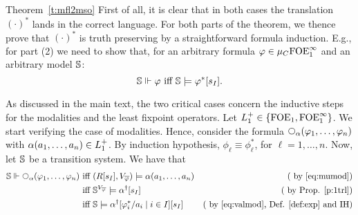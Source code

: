 \begin{proofof}{Theorem~\ref{t:mfl2mso}}
First of all, it is clear that in both cases the translation $(\cdot)^{*}$ lands 
in the correct language.
For both parts of the theorem, we thence prove that $(\cdot)^{*}$ is truth
preserving by a straightforward formula induction.
E.g., for part (2) we need to show that, for an arbitrary formula $\varphi\in
\mu_{C}\mathrm{FOE}^{\infty}_1$ and an arbitrary model $\mathbb{S}$:
\begin{equation}
\label{eq:xxxx1}
\bbS \mmodels \phi \text{ iff } \bbS \models \phi^{*}[s_{I}].
\end{equation}

As discussed in the main text, the two critical cases concern the inductive 
steps for the modalities and the least fixpoint operators. 
Let $ L_{1}^{+} \in \{\mathrm{FOE}_1,\mathrm{FOE}^{\infty}_1\}$.
We start verifying the case of modalities. 
Hence, consider the formula $\nxt{\al}(\varphi_{1},\ldots,\varphi_{n})$ with 
$\alpha(a_{1},\ldots,a_{n}) \in L_{1}^{+}$. 
By induction hypothesis, $\phi_\ell \equiv \phi^{*}_\ell$, for $\ell=1,\dots, n$.
Now, let $\mathbb{S}$ be a transition system. We have that
\begin{align*}
\bbS \mmodels \nxt{\al}(\varphi_{1},\ldots,\varphi_{n}) \text{ iff } 
  & (R[s_{I}],V_{\overline{\varphi}}) \models \al(a_{1},\ldots,a_{n})  
  & \text{( by \eqref{eq:mumod})}
\\ \text{ iff } 
  & \bbS^{V_{\overline{\varphi}}} \models \al^{\dag}[s_{I}] 
  & \text{( by Prop. \ref{p:1trl})}
\\ \text{ iff } 
  & \bbS \models \al^{\dag}[\phi_{i}^{*}/a_{i} \mid i \in I][s_{I}] 
  & \text{( by \eqref{eq:valmod}, Def. \ref{def:exp} and IH)}
\end{align*}


\end{proofof}

